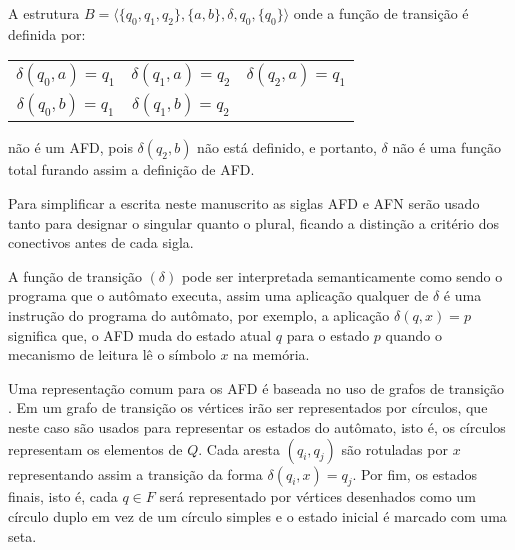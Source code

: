 \begin{example}\label{exe:NaoEAFD}
	A estrutura $B = \langle \{q_0, q_1, q_2\}, \{a, b\}, \delta, q_0, \{q_0\} \rangle$ onde a função de transição é definida por:
	\begin{table*}[h]
		\centering
		\begin{tabular}{ccc}
			$\delta(q_0, a) = q_1$ & $\delta(q_1, a) = q_2$ & $\delta(q_2, a) = q_1$\\
			$\delta(q_0, b) = q_1$ & $\delta(q_1, b) = q_2$ & 
		\end{tabular}
	\end{table*}

	\noindent não é um AFD, pois $\delta(q_2, b)$ não está definido, e portanto, $\delta$ não é uma função total furando assim a definição de AFD.
\end{example}

\begin{note}
	Para simplificar a escrita neste manuscrito as siglas AFD e AFN serão usado tanto para designar o singular quanto o plural, ficando a distinção a critério dos conectivos antes de cada sigla.
\end{note}

A função de transição $(\delta)$ pode ser interpretada semanticamente como sendo o programa que o autômato executa, assim uma aplicação qualquer de $\delta$ é uma instrução do programa do autômato, por exemplo, a aplicação $\delta(q, x) = p$ significa que, o AFD muda do estado atual $q$ para o estado $p$ quando o mecanismo de leitura lê o símbolo $x$ na memória. 

Uma representação comum para os AFD é baseada no uso de grafos de transição \cite{valdi2020phd}. Em um grafo de transição os vértices irão ser representados por círculos, que neste caso são usados para representar os estados do autômato, isto é, os círculos representam os elementos de $Q$. Cada aresta $(q_i, q_j)$ são rotuladas por $x$ representando assim a transição da forma $\delta(q_i, x) = q_j$. Por fim, os estados finais, isto é, cada $q \in F$ será representado por vértices desenhados como um círculo duplo em vez de um círculo simples e o estado inicial é marcado com uma seta.

